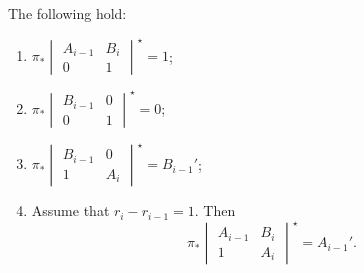\begin{Lemma}\label{lemma:main-push} The following hold:
 \begin{enumerate}[label=$(\alph*)$]\itemsep=0pt
 \item $\pi_* \begin{vmatrix}
 A_{i-1} & B_i\\
 0 & 1
 \end{vmatrix}^\star= 1$;
 \item $\pi_* \begin{vmatrix}
 B_{i-1} & 0\\
 0 & 1
 \end{vmatrix}^\star = 0$;
 \item $\pi_* \begin{vmatrix} B_{i-1} & 0\\ 1 & A_{i} \end{vmatrix}^\star = B_{i-1}'$;
 \item Assume that $r_i - r_{i-1} = 1$. Then
 \[
 \pi_* \begin{vmatrix} A_{i-1} & B_i\\1 & A_i
 \end{vmatrix}^\star = A_{i-1}'.
 \]
 \end{enumerate}
 \end{Lemma}
